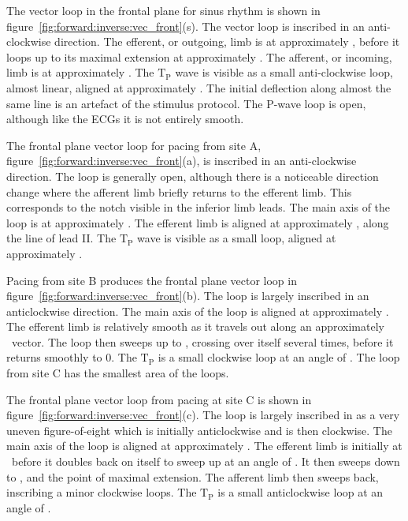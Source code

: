 The vector loop in the frontal plane for sinus rhythm is shown in
figure~\ref{fig:forward:inverse:vec_front}(s).
The vector loop is inscribed in an anti-clockwise direction.
The efferent, or outgoing, limb is at approximately , before it loops up to its
maximal extension at approximately .
The afferent, or incoming, limb is at approximately .
The $\text{T}_{\text{P}}$ wave is visible as a small anti-clockwise loop,
almost linear, aligned at approximately .
The initial deflection along almost the same line is an artefact of the stimulus
protocol.
The P-wave loop is open, although like the ECGs it is not entirely smooth.

The frontal plane vector loop for pacing from site A,
figure~\ref{fig:forward:inverse:vec_front}(a), is inscribed in an anti-clockwise
direction.
The loop is generally open, although there is a noticeable direction change
where the afferent limb briefly returns to the efferent limb.
This corresponds to the notch visible in the inferior limb leads.
The main axis of the loop is at approximately .
The efferent limb is aligned at approximately , along the line of lead
II.
The $\text{T}_{\text{P}}$ wave is visible as a small loop, aligned at
approximately .

Pacing from site B produces the frontal plane vector loop in
figure~\ref{fig:forward:inverse:vec_front}(b).
The loop is largely inscribed in an anticlockwise direction.
The main axis of the loop is aligned at approximately .
The efferent limb is relatively smooth as it travels out along an approximately
\ vector.
The loop then sweeps up to , crossing over itself several times, before
it returns smoothly to 0.
The $\text{T}_{\text{P}}$ is a small clockwise loop at an angle of .
The loop from site C has the smallest area of the loops.

The frontal plane vector loop from pacing at site C is shown in
figure~\ref{fig:forward:inverse:vec_front}(c).
The loop is largely inscribed in as a very uneven figure-of-eight which is
initially anticlockwise and is then clockwise.
The main axis of the loop is aligned at approximately .
The efferent limb is initially at \ before it doubles back on itself
to sweep up at an angle of .
It then sweeps down to , and the point of maximal extension.
The afferent limb then sweeps back, inscribing a minor clockwise loops.
The $\text{T}_{\text{P}}$ is a small anticlockwise loop at an angle of .

